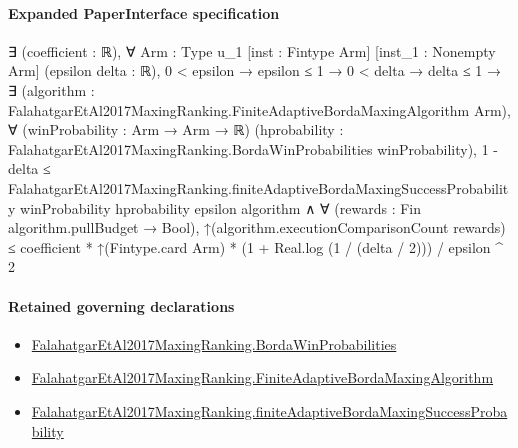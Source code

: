 \documentclass[10pt]{article}
\begin{document}
\paragraph{Expanded PaperInterface specification}
\begin{ReviewVerbatim}
∃ (coefficient : ℝ),
  ∀ {Arm : Type u_1} [inst : Fintype Arm] [inst_1 : Nonempty Arm] (epsilon delta : ℝ),
    0 < epsilon →
      epsilon ≤ 1 →
        0 < delta →
          delta ≤ 1 →
            ∃ (algorithm : FalahatgarEtAl2017MaxingRanking.FiniteAdaptiveBordaMaxingAlgorithm Arm),
              ∀ (winProbability : Arm → Arm → ℝ)
                (hprobability : FalahatgarEtAl2017MaxingRanking.BordaWinProbabilities winProbability),
                1 - delta ≤
                    FalahatgarEtAl2017MaxingRanking.finiteAdaptiveBordaMaxingSuccessProbability winProbability
                      hprobability epsilon algorithm ∧
                  ∀ (rewards : Fin algorithm.pullBudget → Bool),
                    ↑(algorithm.executionComparisonCount rewards) ≤
                      coefficient * ↑(Fintype.card Arm) * (1 + Real.log (1 / (delta / 2))) / epsilon ^ 2
\end{ReviewVerbatim}

\paragraph{Retained governing declarations}
\begin{itemize}\raggedright
\item \hyperlink{paper-prerequisite-5ac1483a89567450}{Falahatgar\allowbreak{}Et\allowbreak{}Al2017\allowbreak{}Maxing\allowbreak{}Ranking.\allowbreak{}Borda\allowbreak{}Win\allowbreak{}Probabilities}
\item \hyperlink{governing-declaration-280da627076d1c6f}{Falahatgar\allowbreak{}Et\allowbreak{}Al2017\allowbreak{}Maxing\allowbreak{}Ranking.\allowbreak{}Finite\allowbreak{}Adaptive\allowbreak{}Borda\allowbreak{}Maxing\allowbreak{}Algorithm}
\item \hyperlink{governing-declaration-5e874b67b421fc05}{Falahatgar\allowbreak{}Et\allowbreak{}Al2017\allowbreak{}Maxing\allowbreak{}Ranking.\allowbreak{}finite\allowbreak{}Adaptive\allowbreak{}Borda\allowbreak{}Maxing\allowbreak{}Success\allowbreak{}Probability}
\end{itemize}
\end{document}
